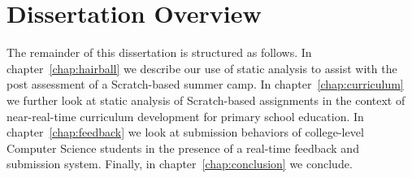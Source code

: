 \section{Dissertation Overview}
The remainder of this dissertation is structured as follows. In
chapter~\ref{chap:hairball} we describe our use of static analysis to assist
with the post assessment of a Scratch-based summer camp. In
chapter~\ref{chap:curriculum} we further look at static analysis of
Scratch-based assignments in the context of near-real-time curriculum
development for primary school education. In chapter~\ref{chap:feedback} we
look at submission behaviors of college-level Computer Science students in the
presence of a real-time feedback and submission system. Finally, in
chapter~\ref{chap:conclusion} we conclude.

